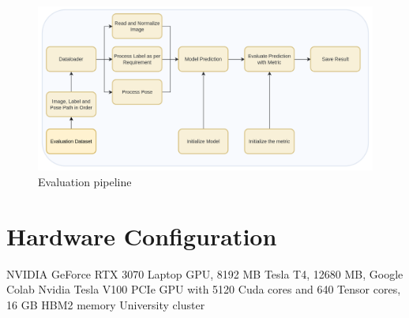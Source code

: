 	\begin{figure}
		\centering
		\includegraphics[width=14cm]{images/evaluation.png}
		\caption{Evaluation pipeline}
		\label{fig:unet_evaluation}
	\end{figure}
    
    \section{Hardware Configuration}
    
    NVIDIA GeForce RTX 3070 Laptop GPU, 8192 MB
    Tesla T4, 12680 MB, Google Colab
    Nvidia Tesla V100 PCIe GPU with 5120 Cuda cores and 640 Tensor cores, 16 GB HBM2 memory University cluster
    

